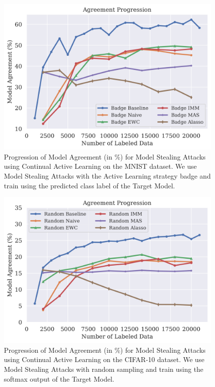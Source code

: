 \begin{figure}[h]
    \centering
    \includegraphics[width=0.7\linewidth]{images/results_CALMS/cifar_label_badge.png}
    \caption[Agreement Comparison for Model Stealing on CIFAR10 using the predicted class label and the Active Learning strategy Badge]{Progression of Model Agreement
    (in \%) for Model Stealing Attacks using Continual Active Learning on the MNIST dataset. We use Model Stealing Attacks with the Active Learning strategy
    \gls{badge} and train using the predicted class label of the Target Model.}
    \label{fig:CALMSCIFAR10LabelBadge}
\end{figure}

\begin{figure}[h]
    \centering
    \includegraphics[width=0.7\linewidth]{images/results_CALMS/cifar100_softmax_random.png}
    \caption[Agreement Comparison for Model Stealing on CIFAR10 using the softmax output and the Active Learning strategy Random]{Progression of Model Agreement
    (in \%) for Model Stealing Attacks using Continual Active Learning on the CIFAR-10 dataset. We use Model Stealing Attacks with random sampling and train
    using the softmax output of the Target Model.}
    \label{fig:CALMSCIFAR10SoftmaxRandom}
\end{figure}

